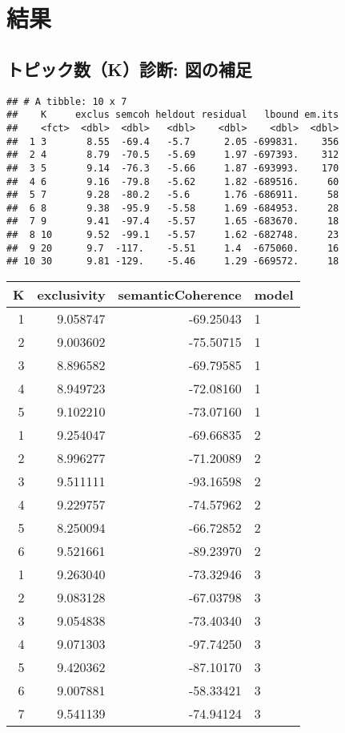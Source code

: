 \documentclass[
]{article}
\begin{document}
\hypertarget{ux7d50ux679c}{%
\section{結果}\label{ux7d50ux679c}}

\hypertarget{ux30c8ux30d4ux30c3ux30afux6570kux8a3aux65ad-ux56f3ux306eux88dcux8db3}{%
\subsection{トピック数（K）診断:
図の補足}\label{ux30c8ux30d4ux30c3ux30afux6570kux8a3aux65ad-ux56f3ux306eux88dcux8db3}}

\begin{verbatim}
## # A tibble: 10 x 7
##    K     exclus semcoh heldout residual   lbound em.its
##    <fct>  <dbl>  <dbl>   <dbl>    <dbl>    <dbl>  <dbl>
##  1 3       8.55  -69.4   -5.7      2.05 -699831.    356
##  2 4       8.79  -70.5   -5.69     1.97 -697393.    312
##  3 5       9.14  -76.3   -5.66     1.87 -693993.    170
##  4 6       9.16  -79.8   -5.62     1.82 -689516.     60
##  5 7       9.28  -80.2   -5.6      1.76 -686911.     58
##  6 8       9.38  -95.9   -5.58     1.69 -684953.     28
##  7 9       9.41  -97.4   -5.57     1.65 -683670.     18
##  8 10      9.52  -99.1   -5.57     1.62 -682748.     23
##  9 20      9.7  -117.    -5.51     1.4  -675060.     16
## 10 30      9.81 -129.    -5.46     1.29 -669572.     18
\end{verbatim}

\begin{tabular}{r|r|r|l}
\hline
K & exclusivity & semanticCoherence & model\\
\hline
1 & 9.058747 & -69.25043 & 1\\
\hline
2 & 9.003602 & -75.50715 & 1\\
\hline
3 & 8.896582 & -69.79585 & 1\\
\hline
4 & 8.949723 & -72.08160 & 1\\
\hline
5 & 9.102210 & -73.07160 & 1\\
\hline
1 & 9.254047 & -69.66835 & 2\\
\hline
2 & 8.996277 & -71.20089 & 2\\
\hline
3 & 9.511111 & -93.16598 & 2\\
\hline
4 & 9.229757 & -74.57962 & 2\\
\hline
5 & 8.250094 & -66.72852 & 2\\
\hline
6 & 9.521661 & -89.23970 & 2\\
\hline
1 & 9.263040 & -73.32946 & 3\\
\hline
2 & 9.083128 & -67.03798 & 3\\
\hline
3 & 9.054838 & -73.40340 & 3\\
\hline
4 & 9.071303 & -97.74250 & 3\\
\hline
5 & 9.420362 & -87.10170 & 3\\
\hline
6 & 9.007881 & -58.33421 & 3\\
\hline
7 & 9.541139 & -74.94124 & 3\\
\hline
\end{tabular}
\end{document}
